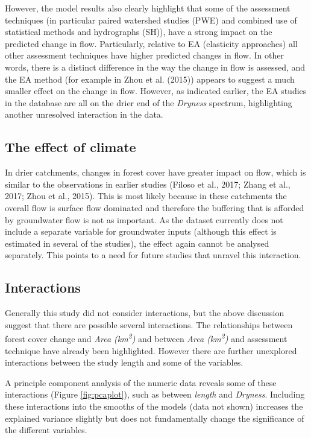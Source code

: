 \documentclass[]{elsarticle} %
\begin{document}
However, the model results also clearly highlight that some of the assessment techniques (in particular paired watershed studies (PWE) and combined use of statistical methods and hydrographs (SH)), have a strong impact on the predicted change in flow. Particularly, relative to EA (elasticity approaches) all other assessment techniques have higher predicted changes in flow. In other words, there is a distinct difference in the way the change in flow is assessed, and the EA method (for example in Zhou et al. (2015)) appears to suggest a much smaller effect on the change in flow. However, as indicated earlier, the EA studies in the database are all on the drier end of the \emph{Dryness} spectrum, highlighting another unresolved interaction in the data.

\hypertarget{the-effect-of-climate}{%
\subsection{The effect of climate}\label{the-effect-of-climate}}

In drier catchments, changes in forest cover have greater impact on flow, which is similar to the observations in earlier studies (Filoso et al., 2017; Zhang et al., 2017; Zhou et al., 2015). This is most likely because in these catchments the overall flow is surface flow dominated and therefore the buffering that is afforded by groundwater flow is not as important. As the dataset currently does not include a separate variable for groundwater inputs (although this effect is estimated in several of the studies), the effect again cannot be analysed separately. This points to a need for future studies that unravel this interaction.

\hypertarget{interactions}{%
\subsection{Interactions}\label{interactions}}

Generally this study did not consider interactions, but the above discussion suggest that there are possible several interactions. The relationships between forest cover change and \emph{Area (km\textsuperscript{2})} and between \emph{Area (km\textsuperscript{2})} and assessment technique have already been highlighted. However there are further unexplored interactions between the study length and some of the variables.

A principle component analysis of the numeric data reveals some of these interactions (Figure \ref{fig:pcaplot}), such as between \emph{length} and \emph{Dryness}. Including these interactions into the smooths of the models (data not shown) increases the explained variance slightly but does not fundamentally change the significance of the different variables.
\end{document}
